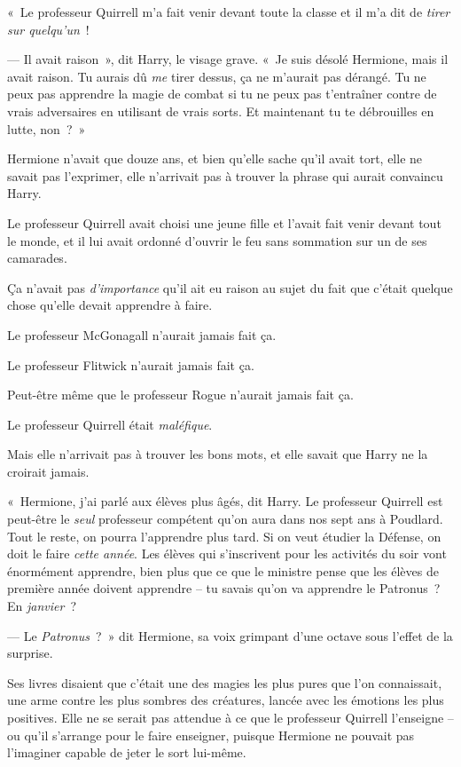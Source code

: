 «~Le professeur Quirrell m'a fait venir devant toute la classe et il m'a dit de \emph{tirer sur quelqu'un}~!

--- Il avait raison~», dit Harry, le visage grave. «~Je suis désolé Hermione, mais il avait raison. Tu aurais dû \emph{me} tirer dessus, ça ne m'aurait pas dérangé. Tu ne peux pas apprendre la magie de combat si tu ne peux pas t'entraîner contre de vrais adversaires en utilisant de vrais sorts. Et maintenant tu te débrouilles en lutte, non~?~»

Hermione n'avait que douze ans, et bien qu'elle sache qu'il avait tort, elle ne savait pas l'exprimer, elle n'arrivait pas à trouver la phrase qui aurait convaincu Harry.

Le professeur Quirrell avait choisi une jeune fille et l'avait fait venir devant tout le monde, et il lui avait ordonné d'ouvrir le feu sans sommation sur un de ses camarades.

Ça n'avait pas \emph{d'importance} qu'il ait eu raison au sujet du fait que c'était quelque chose qu'elle devait apprendre à faire.

Le professeur McGonagall n'aurait jamais fait ça.

Le professeur Flitwick n'aurait jamais fait ça.

Peut-être même que le professeur Rogue n'aurait jamais fait ça.

Le professeur Quirrell était \emph{maléfique}.

Mais elle n'arrivait pas à trouver les bons mots, et elle savait que Harry ne la croirait jamais.

«~Hermione, j'ai parlé aux élèves plus âgés, dit Harry. Le professeur Quirrell est peut-être le \emph{seul} professeur compétent qu'on aura dans nos sept ans à Poudlard. Tout le reste, on pourra l'apprendre plus tard. Si on veut étudier la Défense, on doit le faire \emph{cette année}. Les élèves qui s'inscrivent pour les activités du soir vont énormément apprendre, bien plus que ce que le ministre pense que les élèves de première année doivent apprendre -- tu savais qu'on va apprendre le Patronus~? En \emph{janvier}~?

--- Le \emph{Patronus}~?~» dit Hermione, sa voix grimpant d'une octave sous l'effet de la surprise.

Ses livres disaient que c'était une des magies les plus pures que l'on connaissait, une arme contre les plus sombres des créatures, lancée avec les émotions les plus positives. Elle ne se serait pas attendue à ce que le professeur Quirrell l'enseigne -- ou qu'il s'arrange pour le faire enseigner, puisque Hermione ne pouvait pas l'imaginer capable de jeter le sort lui-même.

